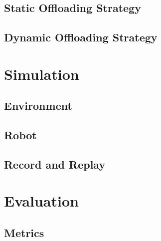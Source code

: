 
\subsection{Static Offloading Strategy}


\subsection{Dynamic Offloading Strategy}

\section{Simulation}\label{sec:general_setup:simulation}

\subsection{Environment}


\subsection{Robot}


\subsection{Record and Replay}


\section{Evaluation}\label{sec:general_setup:evaluation}

\subsection{Metrics}

